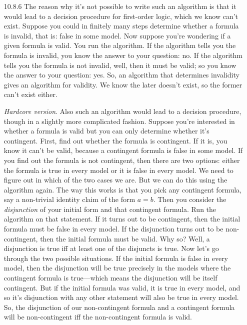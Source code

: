 \begin{itemize}
  \item[10.8.6] The reason why it's not possible to write such an
    algorithm is that it would lead to a decision procedure for
    first-order logic, which we know can't exist. Suppose you could in
    finitely many steps determine whether a formula is invalid, that
    is: false in some model. Now suppose you're wondering if a given
    formula is valid. You run the algorithm. If the algorithm tells
    you the formula is invalid, you know the answer to your question:
    no. If the algorithm tells you the formula is not invalid, well,
    then it must be valid; so you know the answer to your question:
    yes. So, an algorithm that determines invalidity gives an
    algorithm for validity. We know the later doesn't exist, so the
    former can't exist either.

    \emph{Hardcore version}. Also such an algorithm would lead to a
    decision procedure, though in a slightly more complicated
    fashion. Suppose you're interested in whether a formula is valid
    but you can only determine whether it's contingent. First, find
    out whether the formula is contingent. If it is, you know it can't
    be valid, because a contingent formula is false in some model. If
    you find out the formula is not contingent, then there are
    two options: either the formula is true in every model
    or it is false in every model. We need to figure out in which of
    the two cases we are. But we can do this using the algorithm
    again. The way this works is that you pick any contingent formula,
    say a non-trivial identity claim of the form $a=b$. Then you
    consider the \emph{disjunction} of your initial form and that
    contingent formula. Run the algorithm on that statement. If it
    turns out to be contingent, then the initial formula must be false
    in every model. If the disjunction turns out to be non-contingent,
    then the initial formula must be valid. Why so? Well, a disjunction
    is true iff at least one of the disjuncts is true. Now let's go
    through the two possible situations. If the initial formula is
    false in every model, then the disjunction will be true precisely
    in the models where the contingent formula is true---which means
    the disjunction will be itself contingent. But if the initial
    formula was valid, it is true in every model, and so it's
    disjunction with any other statement will also be true in every
    model. So, the disjunction of our non-contingent formula and a
    contingent formula will be non-contingent iff the non-contingent
    formula is valid.
  
\end{itemize}


